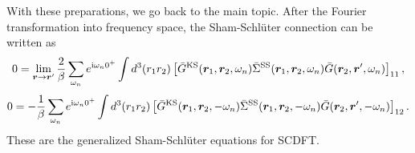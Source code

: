 With these preparations, we go back to the main topic. After the Fourier transformation into frequency space,
the Sham-Schl\"{u}ter connection can be written as
%
\begin{equation}
	0 = \lim_{\bm r \to \bm r'} \frac{2}{\beta} \sum_{\omega_n}
	e^{ {\rm i}\omega_n 0^{+}} 
	\int d^3(r_1 r_2) \left[ \bar{G}^{\rm KS}(\bm r_1, \bm r_2, \omega_n)
	\bar{\Sigma }^{\rm SS}(\bm r_1, \bm r_2, \omega_n) \bar{G}(\bm r_2, \bm r', \omega_n)
	\right]_{11},
	\label{eq:AppSSrho}
\end{equation}
%
\begin{equation}
	0 = - \frac{1}{\beta} \sum_{\omega_n}
	e^{ {\rm i}\omega_n 0^{+}} 
	\int d^3(r_1 r_2) \left[ \bar{G}^{\rm KS}(\bm r_1, \bm r_2, -\omega_n)
	\bar{\Sigma }^{\rm SS}(\bm r_1, \bm r_2, -\omega_n) \bar{G}(\bm r_2, \bm r', -\omega_n)
	\right]_{12}.
	\label{eq:AppSSanom}
\end{equation}
%
These are the generalized Sham-Schl\"{u}ter equations for SCDFT.

